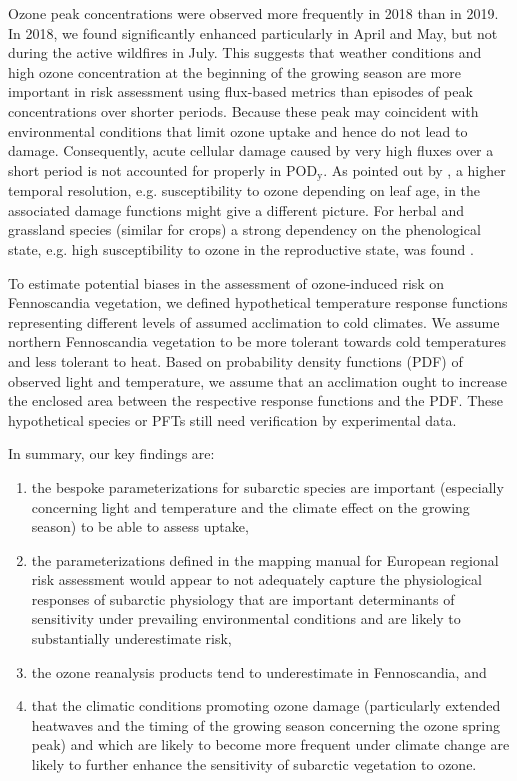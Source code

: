 \documentclass[bg, manuscript]{copernicus}
\begin{document}
Ozone peak concentrations were observed more frequently in 2018 than in 2019. In 2018, we found significantly enhanced \chem{[O_3]} particularly in April and May, but not during the active wildfires in July. This suggests that weather conditions and high ozone concentration at the beginning of the growing season are more important in risk assessment using flux-based metrics than episodes of peak concentrations over shorter periods. Because these peak \chem{[O_3]} may coincident with environmental conditions that limit ozone uptake and hence do not lead to damage. Consequently, acute cellular damage caused by very high fluxes over a short period is not accounted for properly in $\mathrm{POD_y}$. As pointed out by \citet{AE:Musselman2006}, a higher temporal resolution, e.g. susceptibility to ozone depending on leaf age, in the associated damage functions might give a different picture. For herbal and grassland species (similar for crops) a strong dependency on the phenological state, e.g. high susceptibility to ozone in the reproductive state, was found \citep{EP:Bassin2004}. 

To estimate potential biases in the assessment of ozone-induced risk on Fennoscandia vegetation, we defined hypothetical temperature response functions representing different levels of assumed acclimation to cold climates. We assume northern Fennoscandia vegetation to be more tolerant towards cold temperatures and less tolerant to heat. Based on probability density functions (PDF) of observed light and temperature, we assume that an acclimation ought to increase the enclosed area between the respective response functions and the PDF. These hypothetical species or PFTs still need verification by experimental data.

In summary, our key findings are:
\begin{enumerate}
   \itemsep0pt
 \item the bespoke parameterizations for subarctic species are important (especially concerning light and temperature and the climate effect on the growing season) to be able to assess  uptake,
 \item the parameterizations defined in the mapping manual for European regional risk assessment would appear to not adequately capture the physiological responses of subarctic physiology that are important determinants of \chem{[O_3]} sensitivity under prevailing environmental conditions and are likely to substantially underestimate risk,
 \item the ozone reanalysis products tend to underestimate \chem{[O_3]} in Fennoscandia, and
 \item that the climatic conditions promoting ozone damage (particularly extended heatwaves and the timing of the growing season concerning the ozone spring peak) and which are likely to become more frequent under climate change are likely to further enhance the sensitivity of subarctic vegetation to ozone.
\end{enumerate}
\end{document}
